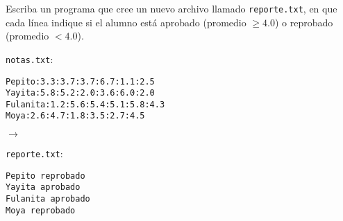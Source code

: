 \documentclass[10pt,spanish]{article}
\begin{document}
\begin{enumerate}
      Escriba un programa que cree un nuevo archivo
      llamado \texttt{reporte.txt},
      en que cada línea indique
      si el alumno está aprobado (promedio \(\ge 4.0\))
      o reprobado (promedio \(< 4.0\)).

      \vspace{2ex}
      \begin{minipage}[c]{.45\textwidth}
        \texttt{notas.txt}:
        \begin{lstlisting}[language={},frame=single]
Pepito:3.3:3.7:3.7:6.7:1.1:2.5
Yayita:5.8:5.2:2.0:3.6:6.0:2.0
Fulanita:1.2:5.6:5.4:5.1:5.8:4.3
Moya:2.6:4.7:1.8:3.5:2.7:4.5
        \end{lstlisting}
      \end{minipage}
      \hspace{1em}
      \(\longrightarrow\)
      \hspace{1em}
      \begin{minipage}[c]{.3\textwidth}
        \texttt{reporte.txt}:
        \begin{lstlisting}[language={},frame=single]
Pepito reprobado
Yayita aprobado
Fulanita aprobado
Moya reprobado
        \end{lstlisting}
      \end{minipage}

  \end{enumerate}
\end{document}
